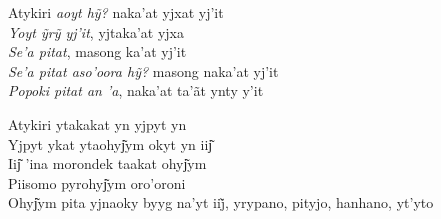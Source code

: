 \bigskip

\begin{linenumbers}\begingroup\raggedright
 
\noindent   Atykiri \emph{aoyt hỹ?} naka’at yjxat yj’it\\
  \emph{Yoyt ỹrỹ yj’it}, yjtaka’at yjxa\\
  \emph{Se'a pitat}, masong ka'at yj'it\\
  \emph{Se’a pitat aso’oora hỹ?} masong naka’at yj’it\\
  \emph{Popoki pitat an 'a}, naka'at ta'ãt ynty y'it
 
\end{linenumbers}\endgroup

\bigskip

\begin{linenumbers}\begingroup\raggedright
 
\noindent   Atykiri ytakakat yn yjpyt yn\\
  Yjpyt ykat ytaohyj͂ym okyt yn iij͂\\
  Iij͂ 'ina morondek taakat ohyj͂ym\\
  Piisomo pyrohyj͂ym oro'oroni\\
  Ohyj͂ym pita yjnaoky byyg na’yt iij̃, yrypano, pityjo, hanhano, yt’yto
 
\end{linenumbers}\endgroup

\bigskip

